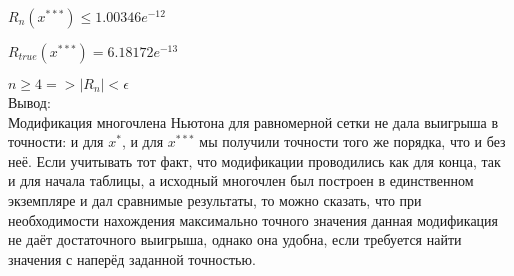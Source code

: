 \documentclass[10pt]{scrartcl}
\begin{document}
$R_n(x^{***}) \leq 1.00346e^{-12}$

$R_{true}(x^{***}) = 6.18172e^{-13}$

$n \geq 4 => |R_n| < \epsilon$\\
Вывод:\\
Модификация многочлена Ньютона для равномерной сетки не дала выигрыша в точности: и для $x^*$, и для $x^{***}$ мы получили точности того же порядка, что и без неё. Если учитывать тот факт, что модификации проводились как для конца, так и для начала таблицы, а исходный многочлен был построен в единственном экземпляре и дал сравнимые результаты, то можно сказать, что при
необходимости нахождения максимально точного значения данная модификация не даёт достаточного выигрыша, однако она удобна, если требуется найти значения с наперёд заданной точностью.
\end{document}
